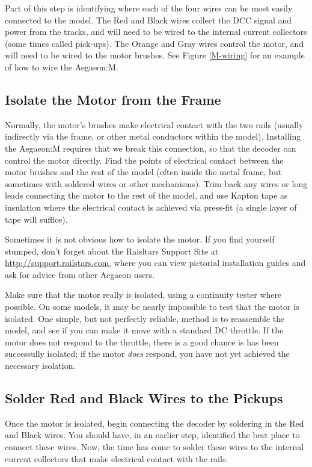 \documentclass[12pt,letterpaper,draft]{memoir} %
\begin{document}
Part of this step is identifying where each of the four wires can be most easily connected to the model. The Red and Black wires collect the DCC signal and power from the tracks, and will need to be wired to the internal current collectors (some times called pick-ups). The Orange and Gray wires control the motor, and will need to be wired to the motor brushes. See Figure \ref{M-wiring} for an example of how to wire the Aegaeon:M.


\subsection{Isolate the Motor from the Frame}
Normally, the motor's brushes make electrical contact with the two rails (usually indirectly via the frame, or other metal conductors within the model). Installing the Aegaeon:M requires that we break this connection, so that the decoder can control the motor directly. Find the points of electrical contact between the motor brushes and the rest of the model (often inside the metal frame, but sometimes with soldered wires or other mechanisms). Trim back any wires or long leads connecting the motor to the rest of the model, and use Kapton tape as insulation where the electrical contact is achieved via press-fit (a single layer of tape will suffice).

Sometimes it is not obvious how to isolate the motor. If you find yourself stumped, don't forget about the Raisltars Support Site at \url{http://support.railstars.com}, where you can view pictorial installation guides and ask for advice from other Aegaeon users.

Make sure that the motor really is isolated, using a continuity tester where possible. On some models, it may be nearly impossible to test that the motor is isolated. One simple, but not perfectly reliable, method is to reassemble the model, and see if you can make it move with a standard DC throttle. If the motor does not respond to the throttle, there is a good chance is has been successully isolated; if the motor \textit{does} respond, you have not yet achieved the necessary isolation.

\subsection{Solder Red and Black Wires to the Pickups}
Once the motor is isolated, begin connecting the decoder by soldering in the Red and Black wires. You should have, in an earlier step, identified the best place to connect these wires. Now, the time has come to solder these wires to the internal current collectors that make electrical contact with the rails.
\end{document}
